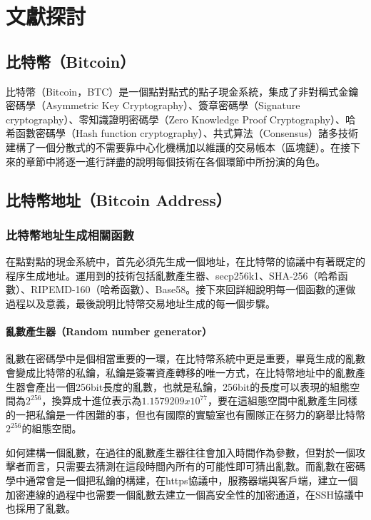 
\chapter{文獻探討}
	\section{比特幣（Bitcoin）}
	比特幣（Bitcoin，BTC）是一個點對點式的點子現金系統，集成了非對稱式金鑰密碼學（Asymmetric Key Cryptography）\parencite{AsymmetricKeyCryptography}、簽章密碼學（Signature cryptography）、零知識證明密碼學（Zero Knowledge Proof Cryptography）\parencite{Zero-KnowledgeProofsofIdentity}、哈希函數密碼學（Hash function cryptography）、共式算法（Consensus）諸多技術建構了一個分散式的不需要靠中心化機構加以維護的交易帳本（區塊鏈）。在接下來的章節中將逐一進行詳盡的說明每個技術在各個環節中所扮演的角色。

	\section{比特幣地址（Bitcoin Address）}

		\subsection{比特幣地址生成相關函數}
		在點對點的現金系統中，首先必須先生成一個地址，在比特幣的協議中有著既定的程序生成地址。運用到的技術包括亂數產生器、secp256k1\parencite{johnson2001elliptic}、SHA-256（哈希函數）\parencite{DBLP:conf/fse/KhovratovichRS12}、RIPEMD-160（哈希函數）\parencite{DBLP:conf/isw/MendelPRR06}、Base58\parencite{Base58}。接下來回詳細說明每一個函數的運做過程以及意義，最後說明比特幣交易地址生成的每一個步驟。
		\subsubsection{亂數產生器（Random number generator）}
		亂數在密碼學中是個相當重要的一環，在比特幣系統中更是重要，畢竟生成的亂數會變成比特幣的私鑰，私鑰是簽署資產轉移的唯一方式，在比特幣地址中的亂數產生器會產出一個256bit長度的亂數，也就是私鑰，256bit的長度可以表現的組態空間為$2^{256}$，換算成十進位表示為$1.1579209x10^{77}$，要在這組態空間中亂數產生同樣的一把私鑰是一件困難的事，但也有國際的實驗室也有團隊正在努力的窮舉比特幣$2^{256}$的組態空間。

		如何建構一個亂數，在過往的亂數產生器往往會加入時間作為參數，但對於一個攻擊者而言，只需要去猜測在這段時間內所有的可能性即可猜出亂數。而亂數在密碼學中通常會是一個把私鑰的構建，在https協議中，服務器端與客戶端，建立一個加密連線的過程中也需要一個亂數去建立一個高安全性的加密通道，在SSH協議中也採用了亂數。
	
